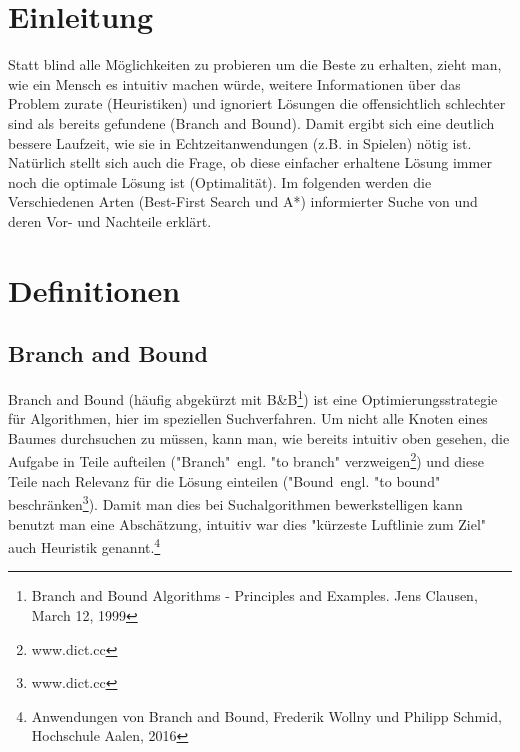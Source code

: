 \section{Einleitung}
Statt blind alle M\"oglichkeiten zu probieren um die Beste zu erhalten, zieht man, wie ein Mensch es intuitiv machen w\"urde, weitere Informationen \"uber das Problem zurate (Heuristiken) und ignoriert L\"osungen die offensichtlich schlechter sind als bereits gefundene (Branch and Bound). Damit ergibt sich eine deutlich bessere Laufzeit, wie sie in Echtzeitanwendungen (z.B. in Spielen) n\"otig ist. Nat\"urlich stellt sich auch die Frage, ob diese einfacher erhaltene L\"osung immer noch die optimale L\"osung ist (Optimalit\"at). Im folgenden werden die Verschiedenen Arten (Best-First Search und A*) informierter Suche von und deren Vor- und Nachteile erkl\"art. 

\section{Definitionen}
\subsection{Branch and Bound}
Branch and Bound (h\"aufig abgek\"urzt mit B\&B\footnote{Branch and Bound Algorithms - Principles and Examples. Jens Clausen, March 12, 1999}) ist eine Optimierungsstrategie f\"ur Algorithmen, hier im speziellen Suchverfahren. Um nicht alle Knoten eines Baumes durchsuchen zu m\"ussen, kann man, wie bereits intuitiv oben gesehen, die Aufgabe in Teile aufteilen ("Branch"\ engl. "to branch" verzweigen\footnote{www.dict.cc}) und diese Teile nach Relevanz f\"ur die L\"osung einteilen ("Bound\ engl. "to bound" beschr\"anken\footnote{www.dict.cc}). 
Damit man dies bei Suchalgorithmen bewerkstelligen kann benutzt man eine Absch\"atzung, intuitiv war dies "k\"urzeste Luftlinie zum Ziel"\, auch Heuristik genannt.\footnote{Anwendungen von Branch and Bound, Frederik Wollny und Philipp Schmid, Hochschule Aalen, 2016}

